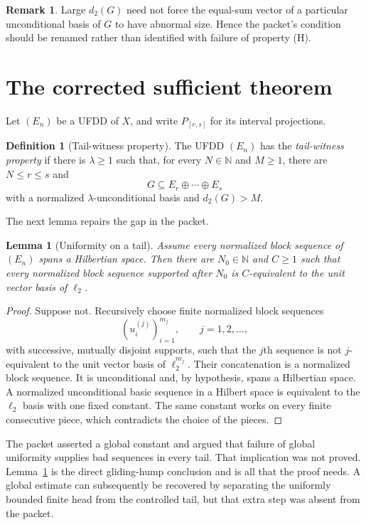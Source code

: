 \documentclass[11pt]{article}
\newtheorem{lemma}[theorem]{Lemma}
\theoremstyle{definition}
\newtheorem{definition}[theorem]{Definition}
\newtheorem{remark}[theorem]{Remark}
\newcommand{\N}{\mathbb N}
\newcommand{\dd}{d_2}
\begin{document}
\begin{remark}\label{rem:H-name}
Large $\dd(G)$ need not force the equal-sum vector of a particular
unconditional basis of $G$ to have abnormal size.  Hence the packet's
condition should be renamed rather than identified with failure of property
(H).
\end{remark}

\section{The corrected sufficient theorem}

Let $(E_n)$ be a UFDD of $X$, and write $P_{[r,s]}$ for its interval
projections.

\begin{definition}[Tail-witness property]
The UFDD $(E_n)$ has the \emph{tail-witness property} if there is
$\lambda\geq1$ such that, for every $N\in\N$ and $M\geq1$, there are
$N\leq r\leq s$ and
\[
  G\subseteq E_r\oplus\cdots\oplus E_s
\]
with a normalized $\lambda$-unconditional basis and $\dd(G)>M$.
\end{definition}

The next lemma repairs the gap in the packet.

\begin{lemma}[Uniformity on a tail]\label{lem:tail-uniformity}
Assume every normalized block sequence of $(E_n)$ spans a Hilbertian space.
Then there are $N_0\in\N$ and $C\geq1$ such that every normalized block
sequence supported after $N_0$ is $C$-equivalent to the unit vector basis of
$\ell_2$.
\end{lemma}

\begin{proof}
Suppose not.  Recursively choose finite normalized block sequences
\[
  (u_i^{(j)})_{i=1}^{m_j},\qquad j=1,2,\ldots,
\]
with successive, mutually disjoint supports, such that the $j$th sequence is
not $j$-equivalent to the unit vector basis of $\ell_2^{m_j}$.  Their
concatenation is a normalized block sequence.  It is unconditional and, by
hypothesis, spans a Hilbertian space.  A normalized unconditional basic
sequence in a Hilbert space is equivalent to the $\ell_2$ basis with one fixed
constant.  The same constant works on every finite consecutive piece, which
contradicts the choice of the pieces.
\end{proof}

The packet asserted a global constant and argued that failure of global
uniformity supplies bad sequences in every tail.  That implication was not
proved.  Lemma~\ref{lem:tail-uniformity} is the direct gliding-hump conclusion
and is all that the proof needs.  A global estimate can subsequently be
recovered by separating the uniformly bounded finite head from the controlled
tail, but that extra step was absent from the packet.
\end{document}
